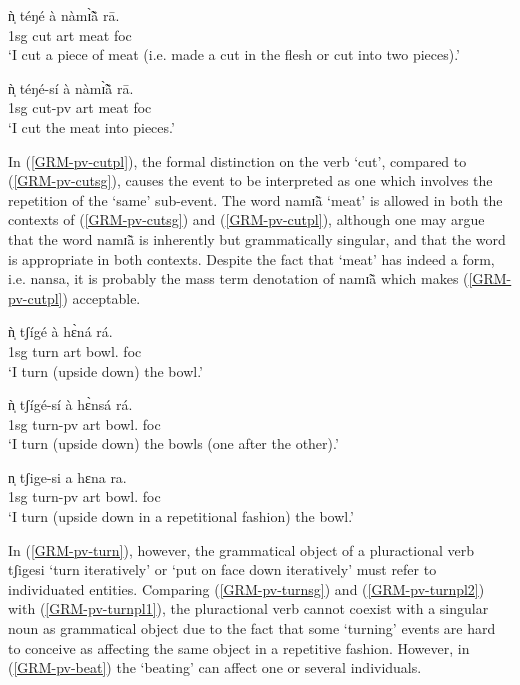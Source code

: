 \begin{exe}
\begin{exe}
\begin{exe}
\begin{exe}
\begin{exe}
\begin{exe}
\begin{exe}
\begin{exe}
\begin{exe}
\begin{exe}
\begin{exe}
\begin{exe}
\ea\label{ex:GRM-pv-cut}
  
 \ea\label{GRM-pv-cutsg}
\gll   ǹ̩  téŋé  à nàmɪ̃̀ã̀  rā.\\
    {\sc 1sg} {cut}  {\sc art} {meat} {\sc foc}\\
\glt `I cut a piece of meat (i.e.  made a cut in the flesh or cut into two
pieces).'

\ex\label{GRM-pv-cutpl}
\gll ǹ̩ téŋé-sí  à nàmɪ̃̀ã̀  rā.\\
    {\sc 1sg} {cut-{\sc pv}} {\sc art} {meat} {\sc foc}\\
\glt `I cut the meat into pieces.'

 
\z 
 \z

\newpage  
In  (\ref{GRM-pv-cutpl}),  the formal distinction on the verb `cut',  compared
to (\ref{GRM-pv-cutsg}),  causes  the event to be interpreted as one which
involves the repetition of the `same'  sub-event.  The word {\sls namɪ̃ã} 
`meat'
is allowed in both the contexts of (\ref{GRM-pv-cutsg}) and
(\ref{GRM-pv-cutpl}), although one may argue that the word {\sls namɪ̃ã} is
inherently
 but grammatically singular,  and that the word is appropriate in both
contexts. Despite the fact that  `meat' has indeed a  form, i.e. {\sls 
nansa}, it is probably the mass term denotation of {\sls namɪ̃ã} which 
makes (\ref{GRM-pv-cutpl}) acceptable. 


\ea\label{GRM-pv-turn}
  
 \ea\label{GRM-pv-turnsg}
\gll   ǹ̩  tʃígé  à  hɛ̀ná  rá.\\
  {\sc 1sg} {turn} {\sc art} {bowl.\sg} {\sc foc}\\
\glt `I turn (upside down) the bowl.'

 \ex\label{GRM-pv-turnpl1}
\gll   ǹ̩  tʃígé-sí  à  hɛ̀nsá  rá.\\
   {\sc 1sg}   {turn-{\sc pv}} {\sc art} {bowl.\pl} {\sc foc}\\
\glt `I turn (upside down) the bowls (one after the other).'


 \ex\label{GRM-pv-turnpl2}
  n̩  tʃige-si   a  hɛna  ra.\\
    {}  {\sc 1sg} {turn-{\sc pv}} {\sc art}  {bowl.\sg}  {\sc foc}\\
\glt `I turn (upside down in a repetitional fashion) the bowl.'

\z 
 \z

In (\ref{GRM-pv-turn}), however,  the grammatical object of a pluractional verb {\sls tʃigesi} `turn iteratively' or `put on face down iteratively'  must refer to individuated entities. Comparing  (\ref{GRM-pv-turnsg}) and (\ref{GRM-pv-turnpl2}) with (\ref{GRM-pv-turnpl1}),   the pluractional verb cannot coexist with a singular noun as grammatical object due to the fact that  some `turning' events are hard to conceive as affecting the same object in a repetitive fashion. However, in (\ref{GRM-pv-beat}) the `beating' can affect  one or several individuals. 


\end{exe}
\end{exe}
\end{exe}
\end{exe}
\end{exe}
\end{exe}
\end{exe}
\end{exe}
\end{exe}
\end{exe}
\end{exe}
\end{exe}
